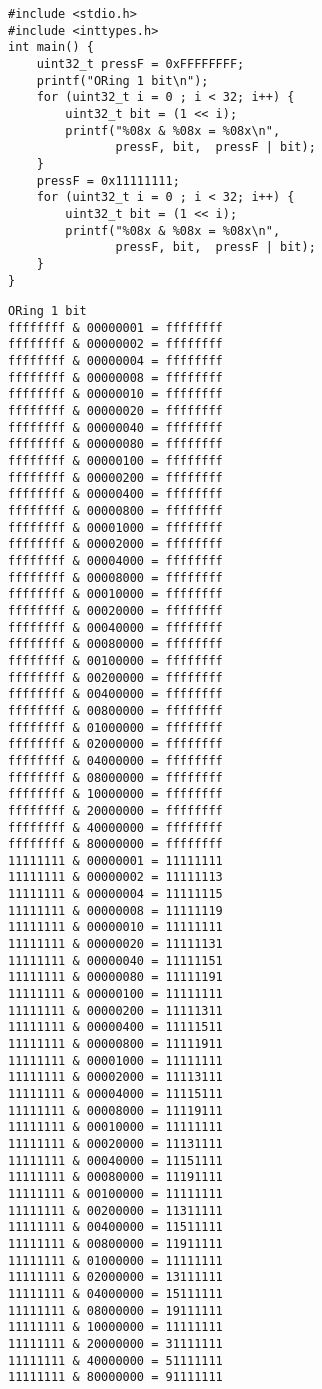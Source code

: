 \documentclass[11pt]{article}
\begin{document}
\begin{verbatim}
#include <stdio.h>
#include <inttypes.h>
int main() {  
    uint32_t pressF = 0xFFFFFFFF;
    printf("ORing 1 bit\n");
    for (uint32_t i = 0 ; i < 32; i++) {
        uint32_t bit = (1 << i);
        printf("%08x & %08x = %08x\n",
               pressF, bit,  pressF | bit);
    }
    pressF = 0x11111111;
    for (uint32_t i = 0 ; i < 32; i++) {
        uint32_t bit = (1 << i);
        printf("%08x & %08x = %08x\n",
               pressF, bit,  pressF | bit);
    }
}
\end{verbatim}

\begin{verbatim}
ORing 1 bit
ffffffff & 00000001 = ffffffff
ffffffff & 00000002 = ffffffff
ffffffff & 00000004 = ffffffff
ffffffff & 00000008 = ffffffff
ffffffff & 00000010 = ffffffff
ffffffff & 00000020 = ffffffff
ffffffff & 00000040 = ffffffff
ffffffff & 00000080 = ffffffff
ffffffff & 00000100 = ffffffff
ffffffff & 00000200 = ffffffff
ffffffff & 00000400 = ffffffff
ffffffff & 00000800 = ffffffff
ffffffff & 00001000 = ffffffff
ffffffff & 00002000 = ffffffff
ffffffff & 00004000 = ffffffff
ffffffff & 00008000 = ffffffff
ffffffff & 00010000 = ffffffff
ffffffff & 00020000 = ffffffff
ffffffff & 00040000 = ffffffff
ffffffff & 00080000 = ffffffff
ffffffff & 00100000 = ffffffff
ffffffff & 00200000 = ffffffff
ffffffff & 00400000 = ffffffff
ffffffff & 00800000 = ffffffff
ffffffff & 01000000 = ffffffff
ffffffff & 02000000 = ffffffff
ffffffff & 04000000 = ffffffff
ffffffff & 08000000 = ffffffff
ffffffff & 10000000 = ffffffff
ffffffff & 20000000 = ffffffff
ffffffff & 40000000 = ffffffff
ffffffff & 80000000 = ffffffff
11111111 & 00000001 = 11111111
11111111 & 00000002 = 11111113
11111111 & 00000004 = 11111115
11111111 & 00000008 = 11111119
11111111 & 00000010 = 11111111
11111111 & 00000020 = 11111131
11111111 & 00000040 = 11111151
11111111 & 00000080 = 11111191
11111111 & 00000100 = 11111111
11111111 & 00000200 = 11111311
11111111 & 00000400 = 11111511
11111111 & 00000800 = 11111911
11111111 & 00001000 = 11111111
11111111 & 00002000 = 11113111
11111111 & 00004000 = 11115111
11111111 & 00008000 = 11119111
11111111 & 00010000 = 11111111
11111111 & 00020000 = 11131111
11111111 & 00040000 = 11151111
11111111 & 00080000 = 11191111
11111111 & 00100000 = 11111111
11111111 & 00200000 = 11311111
11111111 & 00400000 = 11511111
11111111 & 00800000 = 11911111
11111111 & 01000000 = 11111111
11111111 & 02000000 = 13111111
11111111 & 04000000 = 15111111
11111111 & 08000000 = 19111111
11111111 & 10000000 = 11111111
11111111 & 20000000 = 31111111
11111111 & 40000000 = 51111111
11111111 & 80000000 = 91111111
\end{verbatim}
\end{document}
